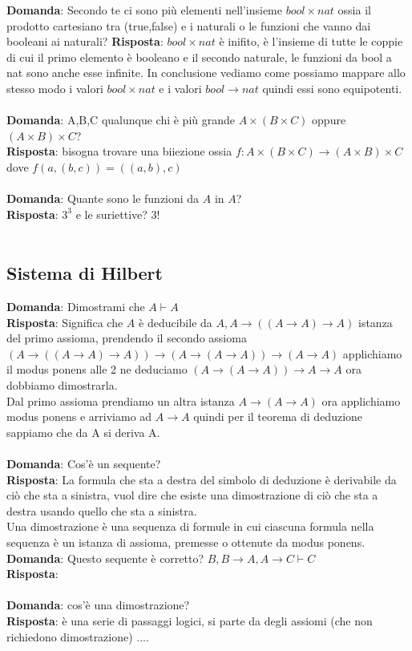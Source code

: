 \documentclass{article}
\begin{document}
\textbf{Domanda}: Secondo te ci sono più elementi nell'insieme $bool \times nat$ ossia il prodotto cartesiano tra (true,false) e i naturali o le funzioni che vanno dai booleani ai naturali?
\textbf{Risposta}: $bool \times nat$ è inifito, è l'insieme di tutte le coppie di cui il primo elemento è booleano e il secondo naturale, le funzioni da bool a nat sono anche esse infinite.
In conclusione vediamo come possiamo mappare allo stesso modo i valori $bool \times nat$ e i valori $bool \to nat$ quindi essi sono equipotenti.\\ \\
\textbf{Domanda}: A,B,C qualunque chi è più grande $A \times (B \times C)$ oppure $(A \times B) \times C$? \\
\textbf{Risposta}: bisogna trovare una biiezione ossia $f: A \times (B \times C) \to (A \times B) \times C$ dove $f(a,(b,c))=((a,b),c)$\\ \\
\textbf{Domanda}: Quante sono le funzioni da $A$ in $A$? \\
\textbf{Risposta}: $3^3$ e le suriettive? $3!$ \\ \\

\subsection{Sistema di Hilbert}
\textbf{Domanda}: Dimostrami che $A \vdash A$ \\
\textbf{Risposta}: Significa che $A$ è deducibile da $A, A \to ((A \to A) \to A)$ istanza del primo assioma,
prendendo il secondo assioma $(A \to ((A \to A) \to A)) \to (A \to (A \to A)) \to (A \to A)$
applichiamo il modus ponens alle 2 ne deduciamo $(A \to (A \to A)) \to A \to A$ ora dobbiamo dimostrarla.\\
Dal primo assioma prendiamo un altra istanza $A \to (A \to A)$ ora applichiamo modus ponens e arriviamo ad $A \to A$ quindi per il teorema di deduzione
sappiamo che da A si deriva A. \\ \\
\textbf{Domanda}: Cos'è un sequente? \\
\textbf{Risposta}: La formula che sta a destra del simbolo di deduzione è derivabile da ciò che sta a sinistra, vuol dire che esiste una dimostrazione di ciò che sta a destra usando quello che sta a sinistra. \\
Una dimostrazione è una sequenza di formule in cui ciascuna formula nella sequenza è un istanza di assioma, premesse o ottenute da modus ponens.
\textbf{Domanda}: Questo sequente è corretto? $B, B \to A, A \to C \vdash C$ \\
\textbf{Risposta}: \\ \\
\textbf{Domanda}: cos'è una dimostrazione? \\
\textbf{Risposta}: è una serie di passaggi logici, si parte da degli assiomi (che non richiedono dimostrazione)  ....\\ \\ 
\end{document}
